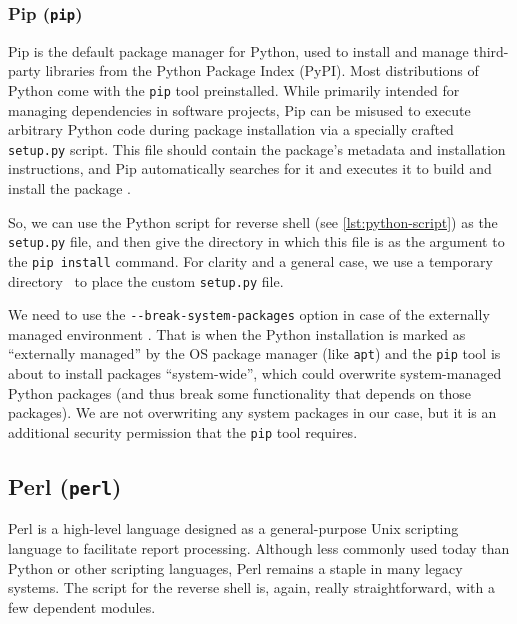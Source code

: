 \subsubsection{Pip (\texttt{pip})}


Pip is the default package manager for Python, used to install and manage third-party libraries from the Python Package Index (PyPI). Most distributions of Python come with the \texttt{pip} tool preinstalled. While primarily intended for managing dependencies in software projects, Pip can be misused to execute arbitrary Python code during package installation via a specially crafted \texttt{setup.py} script. This file should contain the package's metadata and installation instructions, and Pip automatically searches for it and executes it to build and install the package \cite{pip-install-doc}.

So, we can use the Python script for reverse shell (see \cref{lst:python-script}) as the \texttt{setup.py} file, and then give the directory in which this file is as the argument to the \texttt{pip install} command. For clarity and a general case, we use a temporary directory \tmp\ to place the custom \texttt{setup.py} file.



We need to use the \texttt{-{}-break-system-packages} option in case of the externally managed environment \cite{pip-install-doc}. That is when the Python installation is marked as ``externally managed'' by the OS package manager (like \texttt{apt}) and the \texttt{pip} tool is about to install packages ``system-wide'', which could overwrite system-managed Python packages (and thus break some functionality that depends on those packages). We are not overwriting any system packages in our case, but it is an additional security permission that the \texttt{pip} tool requires.


\subsection{Perl (\texttt{perl})}


Perl is a high-level language designed as a general-purpose Unix scripting language to facilitate report processing. Although less commonly used today than Python or other scripting languages, Perl remains a staple in many legacy systems. The script for the reverse shell is, again, really straightforward, with a few dependent modules.


